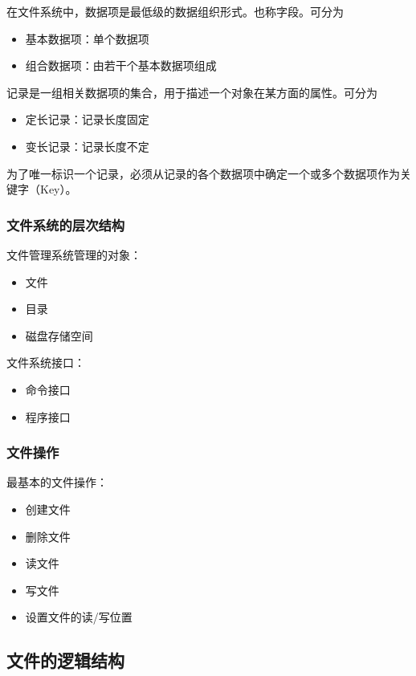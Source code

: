\documentclass[12pt, a4paper, oneside]{ctexart}
\begin{document}
在文件系统中，数据项是最低级的数据组织形式。也称字段。可分为
\begin{itemize}
    \item 基本数据项：单个数据项
    \item 组合数据项：由若干个基本数据项组成
\end{itemize}

记录是一组相关数据项的集合，用于描述一个对象在某方面的属性。可分为
\begin{itemize}
    \item 定长记录：记录长度固定
    \item 变长记录：记录长度不定
\end{itemize}

为了唯一标识一个记录，必须从记录的各个数据项中确定一个或多个数据项作为关键字（Key）。

\subsubsection{文件系统的层次结构}

文件管理系统管理的对象：
\begin{itemize}
    \item 文件
    \item 目录
    \item 磁盘存储空间
\end{itemize}

文件系统接口：
\begin{itemize}
    \item 命令接口
    \item 程序接口
\end{itemize}

\subsubsection{文件操作}

最基本的文件操作：
\begin{itemize}
    \item 创建文件
    \item 删除文件
    \item 读文件
    \item 写文件
    \item 设置文件的读/写位置
\end{itemize}

\subsection{文件的逻辑结构}
\end{document}
